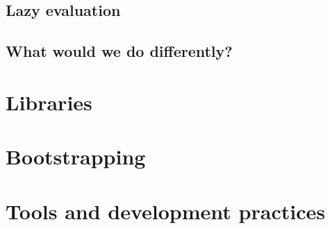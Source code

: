 \documentclass{article}
\begin{document}
\subsection{Lazy evaluation}

%
%
%
%

\subsection{What would we do differently?}




\section{Libraries}

%
%
%

\section{Bootstrapping}


\section{Tools and development practices}

%
%
%
\end{document}
